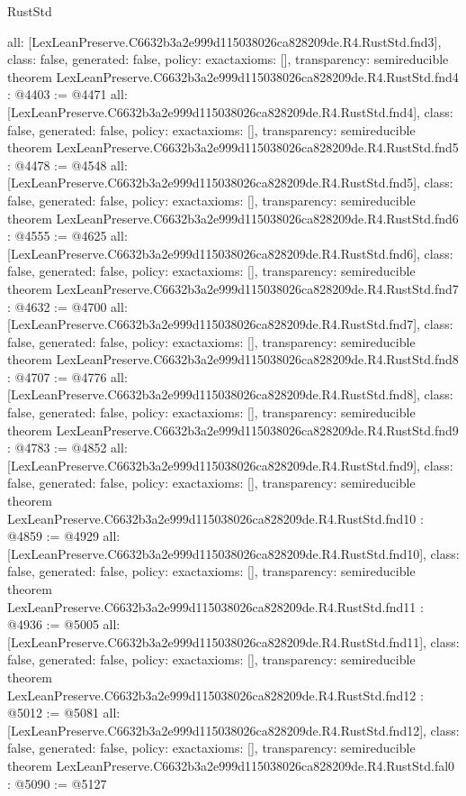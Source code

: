 \begin{lexlean}{RustStd}
\begin{coremodule}
{  all: [LexLeanPreserve.C6632b3a2e999d115038026ca828209de.R4.RustStd.fnd3],
  class: false,
  generated: false,
  policy: exact{axioms: []},
  transparency: semireducible
}
theorem LexLeanPreserve.C6632b3a2e999d115038026ca828209de.R4.RustStd.fnd4 : @4403 := @4471 {
  all: [LexLeanPreserve.C6632b3a2e999d115038026ca828209de.R4.RustStd.fnd4],
  class: false,
  generated: false,
  policy: exact{axioms: []},
  transparency: semireducible
}
theorem LexLeanPreserve.C6632b3a2e999d115038026ca828209de.R4.RustStd.fnd5 : @4478 := @4548 {
  all: [LexLeanPreserve.C6632b3a2e999d115038026ca828209de.R4.RustStd.fnd5],
  class: false,
  generated: false,
  policy: exact{axioms: []},
  transparency: semireducible
}
theorem LexLeanPreserve.C6632b3a2e999d115038026ca828209de.R4.RustStd.fnd6 : @4555 := @4625 {
  all: [LexLeanPreserve.C6632b3a2e999d115038026ca828209de.R4.RustStd.fnd6],
  class: false,
  generated: false,
  policy: exact{axioms: []},
  transparency: semireducible
}
theorem LexLeanPreserve.C6632b3a2e999d115038026ca828209de.R4.RustStd.fnd7 : @4632 := @4700 {
  all: [LexLeanPreserve.C6632b3a2e999d115038026ca828209de.R4.RustStd.fnd7],
  class: false,
  generated: false,
  policy: exact{axioms: []},
  transparency: semireducible
}
theorem LexLeanPreserve.C6632b3a2e999d115038026ca828209de.R4.RustStd.fnd8 : @4707 := @4776 {
  all: [LexLeanPreserve.C6632b3a2e999d115038026ca828209de.R4.RustStd.fnd8],
  class: false,
  generated: false,
  policy: exact{axioms: []},
  transparency: semireducible
}
theorem LexLeanPreserve.C6632b3a2e999d115038026ca828209de.R4.RustStd.fnd9 : @4783 := @4852 {
  all: [LexLeanPreserve.C6632b3a2e999d115038026ca828209de.R4.RustStd.fnd9],
  class: false,
  generated: false,
  policy: exact{axioms: []},
  transparency: semireducible
}
theorem LexLeanPreserve.C6632b3a2e999d115038026ca828209de.R4.RustStd.fnd10 : @4859 := @4929 {
  all: [LexLeanPreserve.C6632b3a2e999d115038026ca828209de.R4.RustStd.fnd10],
  class: false,
  generated: false,
  policy: exact{axioms: []},
  transparency: semireducible
}
theorem LexLeanPreserve.C6632b3a2e999d115038026ca828209de.R4.RustStd.fnd11 : @4936 := @5005 {
  all: [LexLeanPreserve.C6632b3a2e999d115038026ca828209de.R4.RustStd.fnd11],
  class: false,
  generated: false,
  policy: exact{axioms: []},
  transparency: semireducible
}
theorem LexLeanPreserve.C6632b3a2e999d115038026ca828209de.R4.RustStd.fnd12 : @5012 := @5081 {
  all: [LexLeanPreserve.C6632b3a2e999d115038026ca828209de.R4.RustStd.fnd12],
  class: false,
  generated: false,
  policy: exact{axioms: []},
  transparency: semireducible
}
theorem LexLeanPreserve.C6632b3a2e999d115038026ca828209de.R4.RustStd.fal0 : @5090 := @5127 {
}
\end{coremodule}
\end{lexlean}

